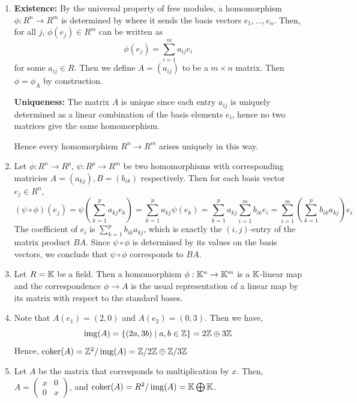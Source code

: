 \documentclass[Notebook.tex]{subfiles}
\begin{document}
    \begin{solution}
        \bbni
        \begin{enumerate}
            \item \textbf{Existence:} By the universal property of free modules, a homomorphism $\phi: R^n \to R^m$ is determined by where it sends the basis vectors $e_1, \ldots, e_n$. Then, for all $j$, $\phi(e_j) \in R^m$ can be written as 
            \[\phi(e_j) = \sum_{i=1}^{m}a_{ij}e_i\]
            for some $a_{ij} \in R$. Then we define $A = (a_{ij})$ to be a $m \times n$ matrix. Then $\phi = \phi_A$ by construction. 

            \textbf{Uniqueness:} The matrix $A$ is unique since each entry $a_{ij}$ is uniquely determined as a linear combination of the basis elements $e_i$, hence no two matrices give the same homomorphism. 

            Hence every homomorphism $R^n \to R^m$ arises uniquely in this way. 


            \item Let $\phi: R^n \to R^p$, $\psi: R^p \to R^m$ be two homomorphisms with corresponding matricies $A = (a_{kj}), B =(b_{ik})$ respectively. Then for each basis vector $e_j \in R^n$, 
            \[(\psi \circ \phi)(e_j) = \psi \left(\sum_{k=1}^{p}a_{kj}e_k\right) = \sum_{k=1}^{p}a_{kj}\psi(e_k) = \sum_{k=1}^{p}a_{kj}\sum_{i=1}^{m}b_{ik}e_i = \sum_{i=1}^m \left(\sum_{k=1}^p b_{ik}a_{kj}\right)e_i\]
            The coefficient of $e_i$ is $\sum_{k=1}^p b_{ik}a_{kj}$,  which is exactly the $(i,j)$-entry of the matrix product $BA$. Since $\psi \circ \phi$ is determined by its values on the basis vectors, we conclude that $\psi \circ \phi$ corresponds to $BA$.


            \item Let $R = \mathbb K$ be a field. Then a homomorphism $\phi: \mathbb K^n \to \mathbb K^m$ is a $\mathbb K$-linear map and the correspondence $\phi \to A$ is the usual representation of a linear map by its matrix with respect to the standard bases. 
            
            \item Note that $A(e_1) = (2, 0)$ and $A(e_2) = (0,3)$. Then we have, 
            \[\operatorname{img}(A) = \{(2a, 3b) \mid a, b \in \mathbb Z\} = 2\mathbb Z \oplus 3\mathbb Z\]
            Hence, $\operatorname{coker}(A) = \mathbb Z^2/\operatorname{img}(A) = \mathbb Z/2\mathbb Z \oplus \mathbb Z/3\mathbb Z $

             \item Let $A$ be the matrix that corresponds to multiplication by $x$. Then, 
            $A = \begin{pmatrix}
                x & 0 \\ 
                0 & x 
            \end{pmatrix}$, and $\operatorname{coker}(A) = R^2/\operatorname{img}(A) = \mathbb K \bigoplus \mathbb K$. 
        \end{enumerate}
    \end{solution}
\end{document}
